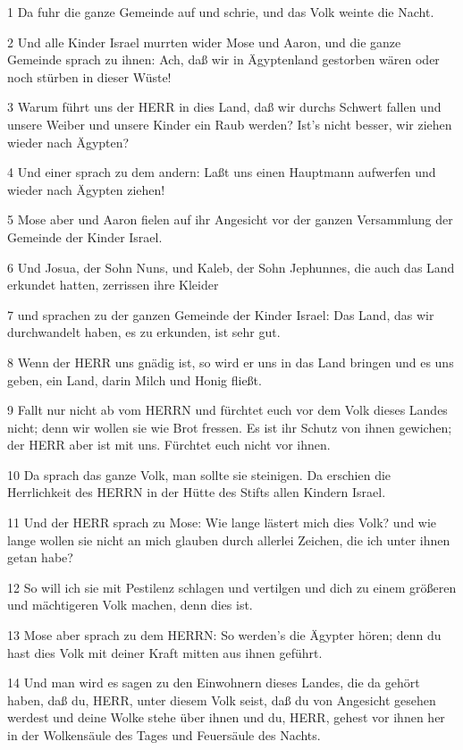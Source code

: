 \par 1 Da fuhr die ganze Gemeinde auf und schrie, und das Volk weinte die Nacht.
\par 2 Und alle Kinder Israel murrten wider Mose und Aaron, und die ganze Gemeinde sprach zu ihnen: Ach, daß wir in Ägyptenland gestorben wären oder noch stürben in dieser Wüste!
\par 3 Warum führt uns der HERR in dies Land, daß wir durchs Schwert fallen und unsere Weiber und unsere Kinder ein Raub werden? Ist's nicht besser, wir ziehen wieder nach Ägypten?
\par 4 Und einer sprach zu dem andern: Laßt uns einen Hauptmann aufwerfen und wieder nach Ägypten ziehen!
\par 5 Mose aber und Aaron fielen auf ihr Angesicht vor der ganzen Versammlung der Gemeinde der Kinder Israel.
\par 6 Und Josua, der Sohn Nuns, und Kaleb, der Sohn Jephunnes, die auch das Land erkundet hatten, zerrissen ihre Kleider
\par 7 und sprachen zu der ganzen Gemeinde der Kinder Israel: Das Land, das wir durchwandelt haben, es zu erkunden, ist sehr gut.
\par 8 Wenn der HERR uns gnädig ist, so wird er uns in das Land bringen und es uns geben, ein Land, darin Milch und Honig fließt.
\par 9 Fallt nur nicht ab vom HERRN und fürchtet euch vor dem Volk dieses Landes nicht; denn wir wollen sie wie Brot fressen. Es ist ihr Schutz von ihnen gewichen; der HERR aber ist mit uns. Fürchtet euch nicht vor ihnen.
\par 10 Da sprach das ganze Volk, man sollte sie steinigen. Da erschien die Herrlichkeit des HERRN in der Hütte des Stifts allen Kindern Israel.
\par 11 Und der HERR sprach zu Mose: Wie lange lästert mich dies Volk? und wie lange wollen sie nicht an mich glauben durch allerlei Zeichen, die ich unter ihnen getan habe?
\par 12 So will ich sie mit Pestilenz schlagen und vertilgen und dich zu einem größeren und mächtigeren Volk machen, denn dies ist.
\par 13 Mose aber sprach zu dem HERRN: So werden's die Ägypter hören; denn du hast dies Volk mit deiner Kraft mitten aus ihnen geführt.
\par 14 Und man wird es sagen zu den Einwohnern dieses Landes, die da gehört haben, daß du, HERR, unter diesem Volk seist, daß du von Angesicht gesehen werdest und deine Wolke stehe über ihnen und du, HERR, gehest vor ihnen her in der Wolkensäule des Tages und Feuersäule des Nachts.
